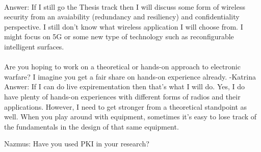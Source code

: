 \paragraph{}
Answer: If I still go the Thesis track then I will discuss some form of wireless security from an avaiability (redundancy and resiliency) and confidentiality perspective.  I still don't know what wireless application I will choose from.  I might focus on 5G or some new type of technology such as reconfigurable intelligent surfaces. 
\paragraph{}
Are you hoping to work on a theoretical or hands-on approach to electronic warfare? I imagine you get a fair share on hands-on experience already. -Katrina
Answer: If I can do live expirementation then that's what I will do.  Yes, I do have plenty of hands-on experiences with different forms of radios and their applications.  However, I need to get stronger from a theoretical standpoint as well.  When you play around with equipment, sometimes it's easy to lose track of the fundamentals in the design of that same equipment.

Nazmus: Have you used PKI in your research?

%
